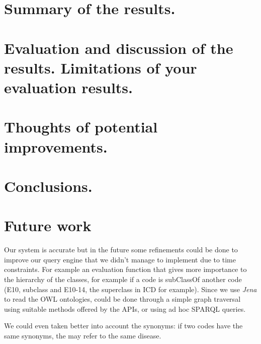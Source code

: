 \documentclass{article}
\begin{document}
\section{Summary of the results.}
\section{Evaluation and discussion of the results. Limitations of your evaluation results.}
\section{Thoughts of potential improvements.}
\section{Conclusions.}

\section{Future work}
Our system is accurate but in the future some refinements could be done to improve our query engine that we didn't manage to implement due to time constraints. For example an evaluation function that gives more  importance to the hierarchy of the classes, for example if a code is subClassOf another code (E10, subclass and E10-14, the superclass in ICD for example). Since we use \emph{Jena} to read the OWL ontologies, could be done through a simple graph traversal using suitable methods offered by the APIs, or using ad hoc SPARQL queries.

We could even taken better into account the synonyms: if two codes have the same synonyms, the may refer to the same disease.
\end{document}
